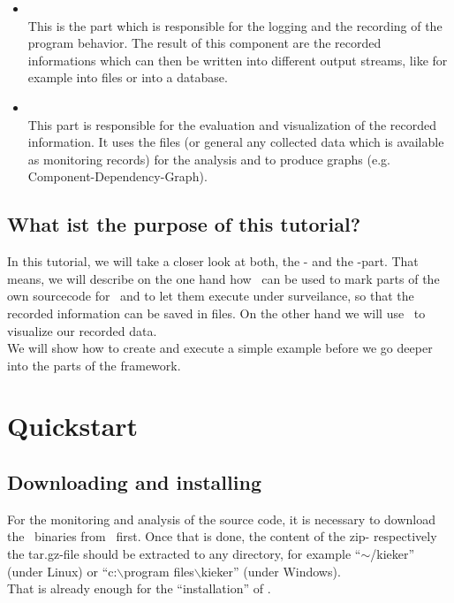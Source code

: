 \documentclass[a4paper, oneside, 11pt]{scrartcl}
\begin{document}
\begin{itemize}
  \item \textbf{\KiekerMonitoring}\\
    This is the part which is responsible for the logging and the recording of the program behavior. The result of this component are the recorded informations which can then be written into different output streams, like for example into files or into a database.
  \item \textbf{\KiekerAnalysis}\\
    This part is responsible for the evaluation and visualization of the recorded information. It uses the files (or general any collected data which is available as monitoring records) for the analysis and to produce graphs (e.g. Component-Dependency-Graph).
\end{itemize}

\subsection{What ist the purpose of this tutorial?}
In this tutorial, we will take a closer look at both, the \textbf{\KiekerMonitoring}- and the \textbf{\KiekerAnalysis}-part. That means, we will describe on the one hand how \KiekerMonitoring\ can be used to mark parts of the own sourcecode for \Kieker\ and to let them execute under surveilance, so that the recorded information can be saved in files. On the other hand we will use \KiekerAnalysis\ to visualize our recorded data.\\
We will show how to create and execute a simple example before we go deeper into the parts of the framework.


\section{Quickstart}

\subsection{Downloading and installing \Kieker}
For the monitoring and analysis of the source code, it is necessary to download the \Kieker\ binaries from \KiekerDownloadUrl\ first. Once that is done, the content of the zip- respectively the tar.gz-file should be extracted to any directory, for example ``$\sim$/kieker'' (under Linux) or ``c:$\backslash$program files$\backslash$kieker'' (under Windows).\\
That is already enough for the ``installation'' of \Kieker.
\end{document}
